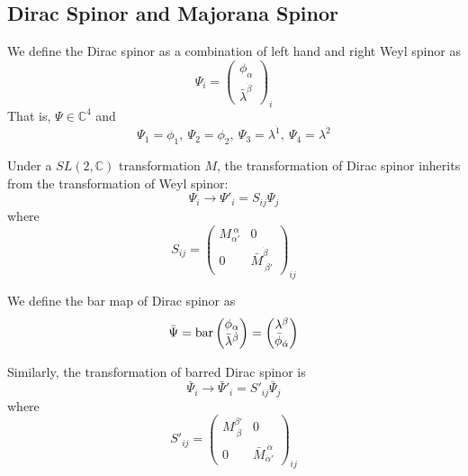 \documentclass[12pt]{book}
\begin{document}
	\subsection{Dirac Spinor and Majorana Spinor}
	
	We define the Dirac spinor as a combination of left hand and right Weyl spinor as
	\begin{equation}
		\Psi_i=\begin{pmatrix}
			\phi_\alpha\\
			\bar\lambda^{\dot\beta}
		\end{pmatrix}_i
	\end{equation}
	That is, $\Psi\in \mathbb C^4$ and
	\begin{equation}
		\Psi_1=\phi_1,\ \Psi_2=\phi_2,\ \Psi_3=\lambda^{\dot 1},\ \Psi_4=\lambda^{\dot 2}
	\end{equation}
	
	Under a $SL(2,\mathbb C)$ transformation $M$, the transformation of Dirac spinor inherits from the transformation of Weyl spinor:
	\begin{equation}
		\Psi_i\rightarrow\Psi'_i=S_{ij}\Psi_j
	\end{equation}
	where
	\begin{equation}
		S_{ij}=\begin{pmatrix}
			M_{\alpha'}^{\ \alpha}&0\\
			0&\bar M^{\dot\beta}_{\ \dot\beta'}
		\end{pmatrix}_{ij}
	\end{equation}
	
	We define the bar map of Dirac spinor as
	\begin{equation}
		\bar \Psi={\rm bar}\begin{pmatrix}
			\phi_\alpha\\
			\bar\lambda^{\dot\beta}
			\end{pmatrix}
			=\begin{pmatrix}
			\lambda^{\beta}\\
			\bar\phi_{\dot\alpha}
			\end{pmatrix}
	\end{equation}
	
	Similarly, the transformation of barred Dirac spinor is
	\begin{equation}
		\bar\Psi_i\rightarrow\bar\Psi'_i=S'_{ij}\bar\Psi_j
	\end{equation}
	where
	\begin{equation}
		S'_{ij}=\begin{pmatrix}
			M^{\beta'}_{\ \beta}&0\\
			0&\bar M_{\dot\alpha'}^{\ \dot\alpha}
		\end{pmatrix}_{ij}
	\end{equation}
	
\end{document}
